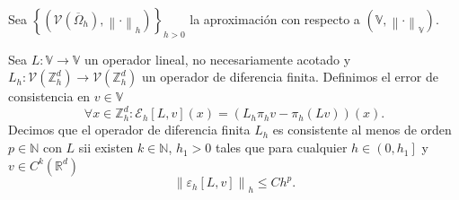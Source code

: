Sea
\begin{math}
    \left\{
    \left(
    \mathcal{V}\left(\overline{\Omega}_{h}\right),
    \left\|\cdot\right\|_{h}
    \right)
    \right\}_{h>0}
\end{math}
la aproximación con respecto a
\begin{math}
    \left(
    \mathbb{V},
    {\left\|\cdot\right\|}_{\mathbb{V}}
    \right)
\end{math}.

\begin{definition}
    Sea
    \begin{math}
        L\colon\mathbb{V}\to\mathbb{V}
    \end{math}
    un operador lineal, no necesariamente acotado y
    \begin{math}
        L_{h}\colon
        \mathcal{V}\left(\mathbb{Z}^{d}_{h}\right)\to
        \mathcal{V}\left(\mathbb{Z}^{d}_{h}\right)
    \end{math}
    un operador de diferencia finita.
    Definimos el error de consistencia en $v\in\mathbb{V}$
    \begin{equation*}
        \forall x\in\mathbb{Z}^{d}_{h}:
        \mathcal{E}_{h}\left[L,v\right]\left(x\right)=
        \left(L_{h}\pi_{h}v-\pi_{h}\left(Lv\right)\right)
        \left(x\right).
    \end{equation*}
    Decimos que el operador de diferencia finita $L_{h}$ es
    consistente al menos de orden $p\in\mathbb{N}$ con $L$ sii
    existen $k\in\mathbb{N}$, $h_{1}>0$ tales que para cualquier
    \begin{math}
        h\in\left(0,h_{1}\right]
    \end{math}
    y
    \begin{math}
        v\in C^{k}\left(\mathbb{R}^{d}\right)
    \end{math}
    \begin{equation*}
        {\left\|\varepsilon_{h}\left[L,v\right]\right\|}_{h}\leq
        C h^{p}.
    \end{equation*}
\end{definition}

